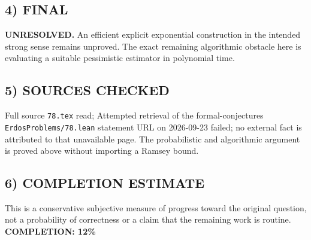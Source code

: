 \subsection{4) FINAL}
\textbf{UNRESOLVED.}
An efficient explicit exponential construction in the intended strong sense remains unproved. The exact remaining algorithmic obstacle here is evaluating a suitable pessimistic estimator in polynomial time.
\subsection{5) SOURCES CHECKED}
Full source \texttt{78.tex} read; Attempted retrieval of the formal-conjectures \texttt{ErdosProblems/78.lean} statement URL on 2026-09-23 failed; no external fact is attributed to that unavailable page. The probabilistic and algorithmic argument is proved above without importing a Ramsey bound.
\subsection{6) COMPLETION ESTIMATE}
This is a conservative subjective measure of progress toward the original question, not a probability of correctness or a claim that the remaining work is routine.
\textbf{COMPLETION: 12\%}
